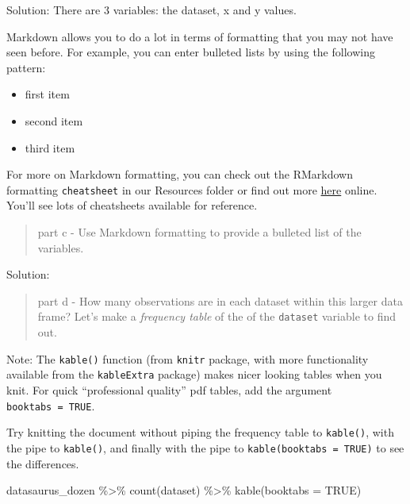 \documentclass[
  letterpaper,
  DIV=11,
  numbers=noendperiod]{scrartcl}
\newenvironment{Shaded}{\begin{snugshade}}{\end{snugshade}}
\newcommand{\AttributeTok}[1]{\textcolor[rgb]{0.40,0.45,0.13}{#1}}
\newcommand{\ConstantTok}[1]{\textcolor[rgb]{0.56,0.35,0.01}{#1}}
\newcommand{\FunctionTok}[1]{\textcolor[rgb]{0.28,0.35,0.67}{#1}}
\newcommand{\NormalTok}[1]{\textcolor[rgb]{0.00,0.23,0.31}{#1}}
\newcommand{\SpecialCharTok}[1]{\textcolor[rgb]{0.37,0.37,0.37}{#1}}
\providecommand{\tightlist}{%
  \setlength{\itemsep}{0pt}\setlength{\parskip}{0pt}}\usepackage{longtable,booktabs,array}
\begin{document}
Solution: There are 3 variables: the dataset, x and y values.

Markdown allows you to do a lot in terms of formatting that you may not
have seen before. For example, you can enter bulleted lists by using the
following pattern:

\begin{itemize}
\tightlist
\item
  first item
\item
  second item
\item
  third item
\end{itemize}

For more on Markdown formatting, you can check out the RMarkdown
formatting \texttt{cheatsheet} in our Resources folder or find out more
\href{https://www.rstudio.com/resources/cheatsheets/}{here} online.
You'll see lots of cheatsheets available for reference.

\begin{quote}
part c - Use Markdown formatting to provide a bulleted list of the
variables.
\end{quote}

Solution:

\begin{quote}
part d - How many observations are in each dataset within this larger
data frame? Let's make a \emph{frequency table} of the of the
\texttt{dataset} variable to find out.
\end{quote}

Note: The \texttt{kable()} function (from \texttt{knitr} package, with
more functionality available from the \texttt{kableExtra} package) makes
nicer looking tables when you knit. For quick ``professional quality''
pdf tables, add the argument \texttt{booktabs\ =\ TRUE}.

Try knitting the document without piping the frequency table to
\texttt{kable()}, with the pipe to \texttt{kable()}, and finally with
the pipe to \texttt{kable(booktabs\ =\ TRUE)} to see the differences.

\begin{Shaded}
\begin{Highlighting}[]
\NormalTok{datasaurus\_dozen }\SpecialCharTok{\%\textgreater{}\%} 
  \FunctionTok{count}\NormalTok{(dataset) }\SpecialCharTok{\%\textgreater{}\%} 
  \FunctionTok{kable}\NormalTok{(}\AttributeTok{booktabs =} \ConstantTok{TRUE}\NormalTok{) }
\end{Highlighting}
\end{Shaded}
\end{document}
